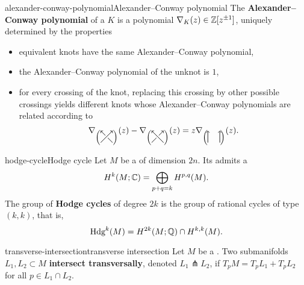 \begin{topic}{alexander-conway-polynomial}{Alexander--Conway polynomial}
    The \textbf{Alexander--Conway polynomial} of a  $K$ is a polynomial $\nabla_K(z) \in \mathbb{Z}[z^{\pm 1}]$, uniquely determined by the properties
    \begin{itemize}
        \item equivalent knots have the same Alexander--Conway polynomial,
        \item the Alexander--Conway polynomial of the unknot is $1$,
        \item for every crossing of the knot, replacing this crossing by other possible crossings yields different knots whose Alexander--Conway polynomials are related according to
        \[ \nabla_{\left( \begin{tikzpicture}[semithick, scale=0.5, baseline=1ex] 
            \draw [-to] (0, 0) -- (1, 1);
            \draw (1, 0) -- (0.6, 0.4);
            \draw [-to] (0.4, 0.6) -- (0, 1);
        \end{tikzpicture} \right)}(z) - \nabla_{\left( \begin{tikzpicture}[semithick, scale=0.5, baseline=1ex]
            \draw (0, 0) -- (0.4, 0.4);
            \draw [-to] (0.6, 0.6) -- (1, 1);
            \draw [-to] (1, 0) -- (0, 1);
        \end{tikzpicture} \right)}(z) = z \nabla_{\left( \begin{tikzpicture}[semithick, scale=0.5, baseline=1ex]
            \draw [-to] (0, 0) -- (0, 1);
            \draw [-to] (1, 0) -- (1, 1);
        \end{tikzpicture} \right)}(z) . \]
    \end{itemize}
\end{topic}

\begin{topic}{hodge-cycle}{Hodge cycle}
    Let $M$ be a   of dimension $2n$.  Its  admits a 
    \[ H^k(M; \mathbb{C}) = \bigoplus_{p + q = k} H^{p, q}(M) . \]
    The group of \textbf{Hodge cycles} of degree $2k$ is the group of rational cycles of type $(k, k)$, that is,
    \[ \textup{Hdg}^k(M) = H^{2k}(M; \mathbb{Q}) \cap H^{k, k}(M) . \]
\end{topic}

\begin{topic}{transverse-intersection}{transverse intersection}
    Let $M$ be a . Two submanifolds $L_1, L_2 \subset M$ \textbf{intersect transversally}, denoted $L_1 \pitchfork L_2$, if $T_p M = T_p L_1 + T_p L_2$ for all $p \in L_1 \cap L_2$.
\end{topic}

